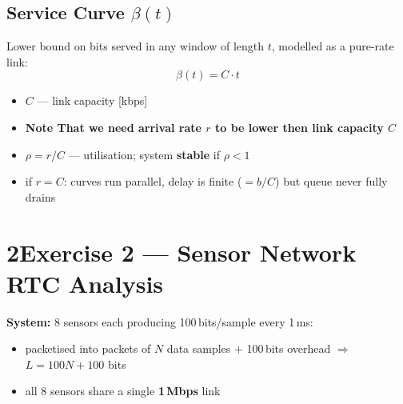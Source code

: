 \documentclass[10pt,a4paper]{article}
\begin{document}
\subsection*{Service Curve $\beta(t)$}
Lower bound on bits served in any window of length $t$, modelled as a pure-rate link:
\[
  \beta(t) = C \cdot t
\]
\begin{itemize}
  \item $C$ --- link capacity [kbps]
\end{itemize}
  \begin{warnbox}
    \begin{itemize}
      \item \textbf{Note That we need arrival rate $r$ to be lower then link capacity $C$}
  \item $\rho = r/C$ --- utilisation; system \textbf{stable} if $\rho < 1$
  \item if $r = C$: curves run parallel, delay is finite ($= b/C$) but queue never fully drains
  \end{itemize}  
\end{warnbox}
\section*{2\quad Exercise 2 --- Sensor Network RTC Analysis}

\textbf{System:} 8 sensors each producing 100\,bits/sample every 1\,ms:
\begin{itemize}
  \item packetised into packets of $N$ data samples $+$ 100\,bits overhead $\Rightarrow$ $L = 100N + 100$ bits
  \item all 8 sensors share a single \textbf{1\,Mbps} link
\end{itemize}
\end{document}
